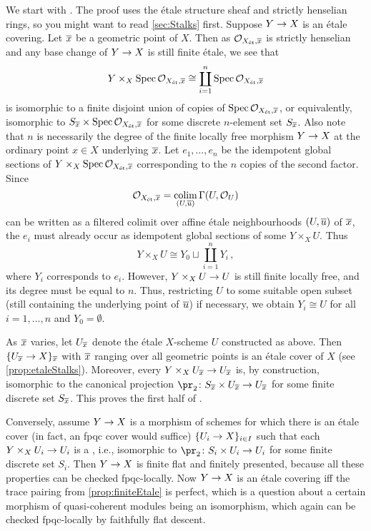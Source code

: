 \begin{proof*}
	We start with . The proof uses the étale structure sheaf and strictly henselian rings, so you might want to read \cref{sec:Stalks} first. Suppose $Y\morphism X$ is an étale covering. Let $\ov{x}$ be a geometric point of $X$. Then as $\Oo_{X_\et,\ov{x}}$ is strictly henselian and any base change of $Y\morphism X$ is still finite étale, we see that
	\begin{equation*}
		Y\times_X\Spec \Oo_{X_\et,\ov{x}}\cong \coprod_{i=1}^n\Spec \Oo_{X_\et,\ov{x}}
	\end{equation*}
	is isomorphic to a finite disjoint union of copies of $\Spec \Oo_{X_\et,\ov{x}}$, or equivalently, isomorphic to $S_{\ov{x}}\times \Spec \Oo_{X_\et,\ov{x}}$ for some discrete $n$-element set $S_{\ov{x}}$. Also note that $n$ is necessarily the degree of the finite locally free morphism $Y\morphism X$ at the ordinary point $x\in X$ underlying $\ov{x}$. Let $e_1,\ldots,e_n$ be the idempotent global sections of $Y\times_X\Spec\Oo_{X_\et,\ov{x}}$ corresponding to the $n$ copies of the second factor. Since 
	\begin{equation*}
		\Oo_{X_\et,\ov{x}}=\colimit_{(U,\ov{u})}\Global(U,\Oo_U)
	\end{equation*}
	can be written as a filtered colimit over affine étale neighbourhoods $(U,\ov{u})$ of $\ov{x}$, the $e_i$ must already occur as idempotent global sections of some $Y\times_XU$. Thus
	\begin{equation*}
		Y\times_XU\cong Y_0\sqcup\coprod_{i=1}^nY_i\,,
	\end{equation*}
	where $Y_i$ corresponds to $e_i$. However, $Y\times_XU\morphism U$ is still finite locally free, and its degree must be equal to $n$. Thus, restricting $U$ to some suitable open subset (still containing the underlying point of $\ov{u}$) if necessary, we obtain $Y_i\cong U$ for all $i=1,\dotsc,n$ and $Y_0=\emptyset$.
	
	As $\ov{x}$ varies, let $U_{\ov{x}}$ denote the étale $X$-scheme $U$ constructed as above. Then $\{U_{\ov{x}}\morphism X\}_{\ov{x}}$ with $\ov{x}$ ranging over all geometric points is an étale cover of $X$ (see \cref{prop:etaleStalks}). Moreover, every $Y\times_XU_{\ov{x}}\morphism U_{\ov{x}}$ is, by construction, isomorphic to the canonical projection $\pr_2\colon S_{\ov{x}}\times U_{\ov{x}}\morphism U_{\ov{x}}$ for some finite discrete set $S_{\ov{x}}$. This proves the first half of .
	
	Conversely, assume $Y\morphism X$ is a morphism of schemes for which there is an étale cover (in fact, an fpqc cover would suffice) $\{U_i\morphism X\}_{i\in I}$ such that each $Y\times_XU_i\morphism U_i$ is a , i.e., isomorphic to $\pr_2\colon S_i\times U_i\morphism U_i$ for some finite discrete set $S_i$. Then $Y\morphism X$ is finite flat and finitely presented, because all these properties can be checked fpqc-locally. Now $Y\morphism X$ is an étale covering iff the trace pairing from \cref{prop:finiteEtale} is perfect, which is a question about a certain morphism of quasi-coherent modules being an isomorphism, which again can be checked fpqc-locally by faithfully flat descent.
	

\end{proof*}
